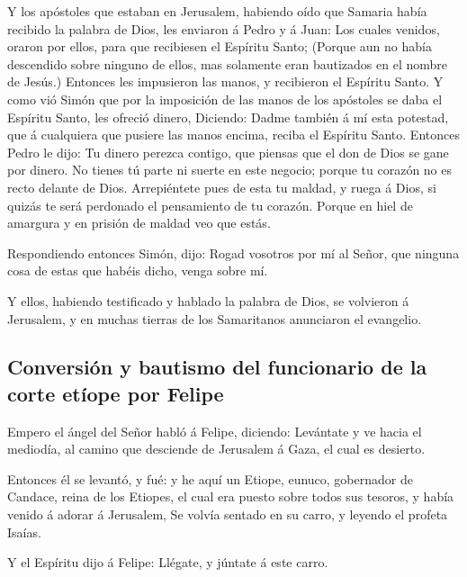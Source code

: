  Y los apóstoles que estaban en Jerusalem, habiendo oído
que Samaria había recibido la palabra de Dios, les enviaron á Pedro y á
Juan:  Los cuales venidos, oraron por ellos, para que
recibiesen el Espíritu Santo;  (Porque aun no había
descendido sobre ninguno de ellos, mas solamente eran bautizados en el
nombre de Jesús.)  Entonces les impusieron las manos, y
recibieron el Espíritu Santo.  Y como vió Simón que por la
imposición de las manos de los apóstoles se daba el Espíritu Santo, les
ofreció dinero,  Diciendo: Dadme también á mí esta
potestad, que á cualquiera que pusiere las manos encima, reciba el
Espíritu Santo.  Entonces Pedro le dijo: Tu dinero perezca
contigo, que piensas que el don de Dios se gane por dinero.
 No tienes tú parte ni suerte en este negocio; porque tu
corazón no es recto delante de Dios.  Arrepiéntete pues de
esta tu maldad, y ruega á Dios, si quizás te será perdonado el
pensamiento de tu corazón.  Porque en hiel de amargura y en
prisión de maldad veo que estás.

 Respondiendo entonces Simón, dijo: Rogad vosotros por mí
al Señor, que ninguna cosa de estas que habéis dicho, venga sobre mí.

 Y ellos, habiendo testificado y hablado la palabra de
Dios, se volvieron á Jerusalem, y en muchas tierras de los Samaritanos
anunciaron el evangelio.

\hypertarget{conversiuxf3n-y-bautismo-del-funcionario-de-la-corte-etuxedope-por-felipe}{%
\subsection{Conversión y bautismo del funcionario de la corte etíope por
Felipe}\label{conversiuxf3n-y-bautismo-del-funcionario-de-la-corte-etuxedope-por-felipe}}

 Empero el ángel del Señor habló á Felipe, diciendo:
Levántate y ve hacia el mediodía, al camino que desciende de Jerusalem á
Gaza, el cual es desierto.

 Entonces él se levantó, y fué: y he aquí un Etiope,
eunuco, gobernador de Candace, reina de los Etiopes, el cual era puesto
sobre todos sus tesoros, y había venido á adorar á Jerusalem,
 Se volvía sentado en su carro, y leyendo el profeta
Isaías.

 Y el Espíritu dijo á Felipe: Llégate, y júntate á este
carro.

